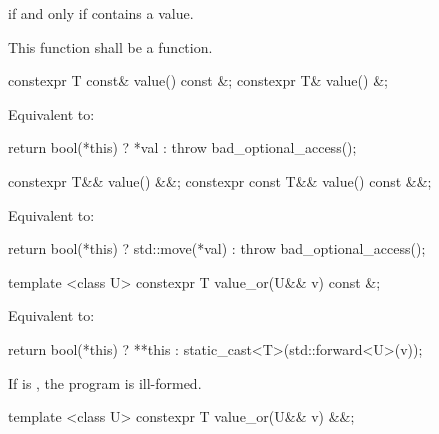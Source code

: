 \begin{itemdescr}
\pnum
\returns {} if and only if  contains a value.

\pnum
\remarks This function shall be a  function.
\end{itemdescr}

%
\begin{itemdecl}
constexpr T const& value() const &;
constexpr T& value() &;
\end{itemdecl}

\begin{itemdescr}
\pnum
\effects
Equivalent to:
\begin{codeblock}
return bool(*this) ? *val : throw bad_optional_access();
\end{codeblock}
\end{itemdescr}

%
\begin{itemdecl}
constexpr T&& value() &&;
constexpr const T&& value() const &&;
\end{itemdecl}

\begin{itemdescr}

\pnum
\effects
Equivalent to:
\begin{codeblock}
return bool(*this) ? std::move(*val) : throw bad_optional_access();
\end{codeblock}
\end{itemdescr}

%
\begin{itemdecl}
template <class U> constexpr T value_or(U&& v) const &;
\end{itemdecl}

\begin{itemdescr}
\pnum
\effects
Equivalent to:
\begin{codeblock}
return bool(*this) ? **this : static_cast<T>(std::forward<U>(v));
\end{codeblock}

\pnum
\remarks
If  is ,
the program is ill-formed.
\end{itemdescr}

%
\begin{itemdecl}
template <class U> constexpr T value_or(U&& v) &&;
\end{itemdecl}

